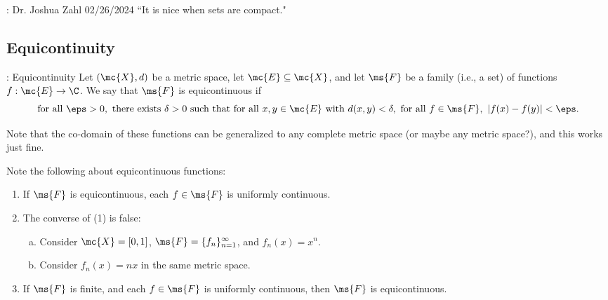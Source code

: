 \begin{nquote}{: Dr. Joshua Zahl 02/26/2024}
	``It is nice when sets are compact."
\end{nquote}

\subsection{Equicontinuity}
\begin{ndef}{: Equicontinuity}
	Let \((\mc{X},d)\) be a metric space, let \(\mc{E}\subseteq\mc{X}\), and let \(\ms{F}\) be a family (i.e., a set) of functions \(f:\mc{E}\to\C\). We say that \(\ms{F}\) is equicontinuous if
	\begin{equation*}
		\text{for all}~\eps>0,~\text{there exists}~\delta>0~\text{such that for all}~x,y\in\mc{E}~\text{with}~d(x,y)<\delta,~\text{for all}~f\in\ms{F},~|f(x)-f(y)|<\eps.
	\end{equation*}
\end{ndef}
\begin{note}[Co-domain]
	Note that the co-domain of these functions can be generalized to any complete metric space (or maybe any metric space?), and this works just fine.
\end{note}
\begin{note}
	Note the following about equicontinuous functions:
	\begin{enumerate}
		\item If \(\ms{F}\) is equicontinuous, each \(f\in\ms{F}\) is uniformly continuous.
		
		\item The converse of (1) is false:
			\begin{enumerate}[(a)]
				\item Consider \(\mc{X}=[0,1]\), \(\ms{F}=\{f_n\}_{n=1}^{\infty}\), and \(f_n(x)=x^n\).
				
				\item Consider \(f_n(x)=nx\) in the same metric space.
			\end{enumerate}
			
		\item If \(\ms{F}\) is finite, and each \(f\in\ms{F}\) is uniformly continuous, then \(\ms{F}\) is equicontinuous.
	\end{enumerate}
\end{note}

